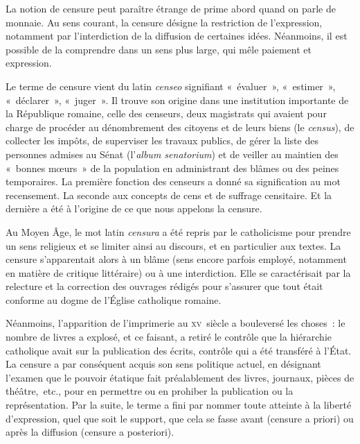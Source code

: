 %

La notion de censure peut paraître étrange de prime abord quand on parle de monnaie. Au sens courant, la censure désigne la restriction de l'expression, notamment par l'interdiction de la diffusion de certaines idées. Néanmoins, il est possible de la comprendre dans un sens plus large, qui mêle paiement et expression.

Le terme de censure vient du latin \emph{censeo} signifiant «~évaluer~», «~estimer~», «~déclarer~», «~juger~». Il trouve son origine dans une institution importante de la République romaine, celle des censeurs, deux magistrats qui avaient pour charge de procéder au dénombrement des citoyens et de leurs biens (le \emph{census}), de collecter les impôts, de superviser les travaux publics, de gérer la liste des personnes admises au Sénat (l'\emph{album senatorium}) et de veiller au maintien des «~bonnes mœurs~» de la population en administrant des blâmes ou des peines temporaires. La première fonction des censeurs a donné sa signification au mot recensement. La seconde aux concepts de cens et de suffrage censitaire. Et la dernière a été à l'origine de ce que nous appelons la censure.

Au Moyen Âge, le mot latin \emph{censura} a été repris par le catholicisme pour prendre un sens religieux et se limiter ainsi au discours, et en particulier aux textes. La censure s'apparentait alors à un blâme (sens encore parfois employé, notamment en matière de critique littéraire) ou à une interdiction. Elle se caractérisait par la relecture et la correction des ouvrages rédigés pour s'assurer que tout était conforme au dogme de l'Église catholique romaine.

Néanmoins, l'apparition de l'imprimerie au \textsc{xv}\ieme{}~siècle a bouleversé les choses~: le nombre de livres a explosé, et ce faisant, a retiré le contrôle que la hiérarchie catholique avait sur la publication des écrits, contrôle qui a été transféré à l'État. La censure a par conséquent acquis son sens politique actuel, en désignant l'examen que le pouvoir étatique fait préalablement des livres, journaux, pièces de théâtre,~etc., pour en permettre ou en prohiber la publication ou la représentation. Par la suite, le terme a fini par nommer toute atteinte à la liberté d'expression, quel que soit le support, que cela se fasse avant (censure a priori) ou après la diffusion (censure a posteriori).

